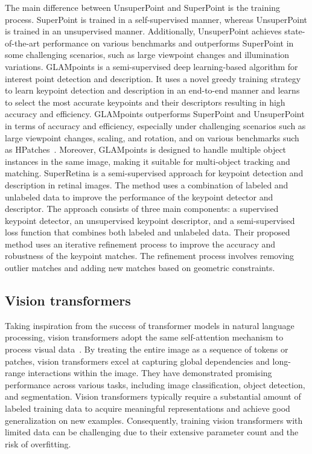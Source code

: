 \documentclass[10pt,twocolumn,letterpaper]{article}
\begin{document}
The main difference between UnsuperPoint and SuperPoint is the training process. SuperPoint is trained in a self-supervised manner, whereas UnsuperPoint is trained in an unsupervised manner. Additionally, UnsuperPoint achieves state-of-the-art performance on various benchmarks and outperforms SuperPoint in some challenging scenarios, such as large viewpoint changes and illumination variations. GLAMpoints \cite{truong2019glampoints} is a semi-supervised deep learning-based algorithm for interest point detection and description. It uses a novel greedy training strategy to learn keypoint detection and description in an end-to-end manner and learns to select the most accurate keypoints and their descriptors resulting in high accuracy and efficiency. GLAMpoints outperforms SuperPoint and UnsuperPoint in terms of accuracy and efficiency, especially under challenging scenarios such as large viewpoint changes, scaling, and rotation, and on various benchmarks such as HPatches~\cite{balntas2017hpatches}. Moreover, GLAMpoints is designed to handle multiple object instances in the same image, making it suitable for multi-object tracking and matching. SuperRetina \cite{liu2022semi} is a semi-supervised approach for keypoint detection and description in retinal images. The method uses a combination of labeled and unlabeled data to improve the performance of the keypoint detector and descriptor. The approach consists of three main components: a supervised keypoint detector, an unsupervised keypoint descriptor, and a semi-supervised loss function that combines both labeled and unlabeled data. Their proposed method uses an iterative refinement process to improve the accuracy and robustness of the keypoint matches. The refinement process involves removing outlier matches and adding new matches based on geometric constraints.

\subsection{Vision transformers}

Taking inspiration from the success of transformer models in natural language processing, vision transformers adopt the same self-attention mechanism to process visual data~\cite{liu2021swin,yu2022metaformer}. By treating the entire image as a sequence of tokens or patches, vision transformers excel at capturing global dependencies and long-range interactions within the image. They have demonstrated promising performance across various tasks, including image classification, object detection, and segmentation.  Vision transformers typically require a substantial amount of labeled training data to acquire meaningful representations and achieve good generalization on new examples. Consequently, training vision transformers with limited data can be challenging due to their extensive parameter count and the risk of overfitting. 
\end{document}
